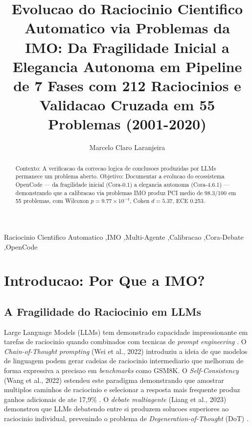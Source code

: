 \documentclass[5p]{elsarticle}
\begin{document}
\begin{frontmatter}
\title{Evolucao do Raciocinio Cientifico Automatico via Problemas da IMO: Da Fragilidade Inicial a Elegancia Autonoma em Pipeline de 7 Fases com 212 Raciocinios e Validacao Cruzada em 55 Problemas (2001-2020)}

\author[geo]{Marcelo Claro Laranjeira}
\address[geo]{GeoMaker+IA --- Museu Escolar Itinerante, CNM 9.76.35.5698, Crateus, CE, Brasil}

\begin{abstract}
Contexto: A verificacao da correcao logica de conclusoes produzidas por LLMs permanece um problema aberto. Objetivo: Documentar a evolucao do ecossistema OpenCode --- da fragilidade inicial (Cora-0.1) a elegancia autonoma (Cora-4.6.1) --- demonstrando que a calibracao via problemas IMO produz PCI medio de 98.3/100 em 55 problemas, com Wilcoxon $p = 9.77\times10^{-4}$, Cohen $d = 5.37$, ECE 0.253.
\end{abstract}

\begin{keyword}
Raciocinio Cientifico Automatico \sep IMO \sep Multi-Agente \sep Calibracao \sep Cora-Debate \sep OpenCode
\end{keyword}
\end{frontmatter}

\section{Introducao: Por Que a IMO?}

\subsection{A Fragilidade do Raciocinio em LLMs}

Large Language Models (LLMs) tem demonstrado capacidade impressionante em tarefas
de raciocinio quando combinados com tecnicas de \textit{prompt engineering}
\cite{wei2022cot}. O \textit{Chain-of-Thought prompting} (Wei et al., 2022)
introduziu a ideia de que modelos de linguagem podem gerar cadeias de raciocinio
intermediario que melhoram de forma expressiva a precisao em \textit{benchmarks}
como GSM8K. O \textit{Self-Consistency} (Wang et al., 2022) estendeu este paradigma
demonstrando que amostrar multiplos caminhos de raciocinio e selecionar a resposta
mais frequente produz ganhos adicionais de ate 17,9\% \cite{wang2022sc}. O
\textit{debate multiagente} (Liang et al., 2023) demonstrou que LLMs debatendo entre
si produzem solucoes superiores ao raciocinio individual, prevenindo o problema de
\textit{Degeneration-of-Thought} (DoT) \cite{liang2023debate}.
\end{document}
